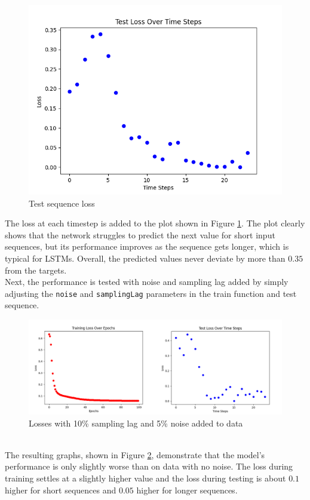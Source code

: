 \documentclass[twoside,a4paper,10pt,DIV=12,BCOR=12mm]{scrartcl}
\begin{document}
\begin{figure}[h!]
    \centering
    \includegraphics[width=0.75\linewidth]{test_loss_graph.png}
    \caption{Test sequence loss}
    \label{fig:test-loss-graph}
\end{figure}
The loss at each timestep is added to the plot shown in Figure \ref{fig:test-loss-graph}. The plot clearly shows that the network struggles to predict the next value for short input sequences, but its performance improves as the sequence gets longer, which is typical for LSTMs. \cite{bolboaca2023lstmperformance} Overall, the predicted values never deviate by more than \begin{math}0.35\end{math} from the targets.\\
Next, the performance is tested with noise and sampling lag added by simply adjusting the \lstinline{noise} and \lstinline{samplingLag} parameters in the train function and test sequence.
\begin{figure}[h!]
    \centering
    \includegraphics[width=\linewidth]{loss_with_noise.png}
    \caption{Losses with 10\% sampling lag and 5\% noise added to data}
    \label{fig:loss-noise}
\end{figure}
\\The resulting graphs, shown in Figure \ref{fig:loss-noise}, demonstrate that the model's performance is only slightly worse than on data with no noise. The loss during training settles at a slightly higher value and the loss during testing is about \begin{math}0.1\end{math} higher for short sequences and  \begin{math}0.05\end{math} higher for longer sequences.\\
\end{document}
